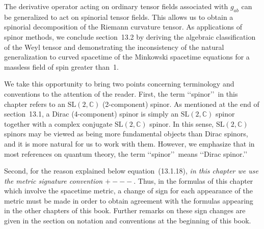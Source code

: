 The derivative operator acting on ordinary tensor fields associated with \(g_{ab}\)
can be generalized to act on spinorial tensor fields. This allows us to obtain a
spinorial decomposition of the Riemann curvature tensor. As applications of spinor
methods, we conclude section~13.2 by deriving the algebraic classification of the
Weyl tensor and demonstrating the inconsistency of the natural generalization to
curved spacetime of the Minkowski spacetime equations for a massless field of spin
greater than~1.

We take this opportunity to bring two points concerning terminology and conventions
to the attention of the reader. First, the term \lq\lq spinor\rq\rq\ in this chapter
refers to an \(\mathrm{SL}(2,\mathbb C)\) (2-component) spinor. As mentioned at the
end of section~13.1, a Dirac (4-component) spinor is simply an
\(\mathrm{SL}(2,\mathbb C)\) spinor together with a complex conjugate
\(\mathrm{SL}(2,\mathbb C)\) spinor. In this sense,
\(\mathrm{SL}(2,\mathbb C)\) spinors may be viewed as being more fundamental
objects than Dirac spinors, and it is more natural for us to work with them.
However, we emphasize that in most references on quantum theory, the term
\lq\lq spinor\rq\rq\ means \lq\lq Dirac spinor.\rq\rq\

Second, for the reason explained below equation~(13.1.18), \emph{in this chapter we
use the metric signature convention \(+---\)}. Thus, in the formulas of this chapter
which involve the spacetime metric, a change of sign for each appearance of the
metric must be made in order to obtain agreement with the formulas appearing in the
other chapters of this book. Further remarks on these sign changes are given in the
section on notation and conventions at the beginning of this book.
